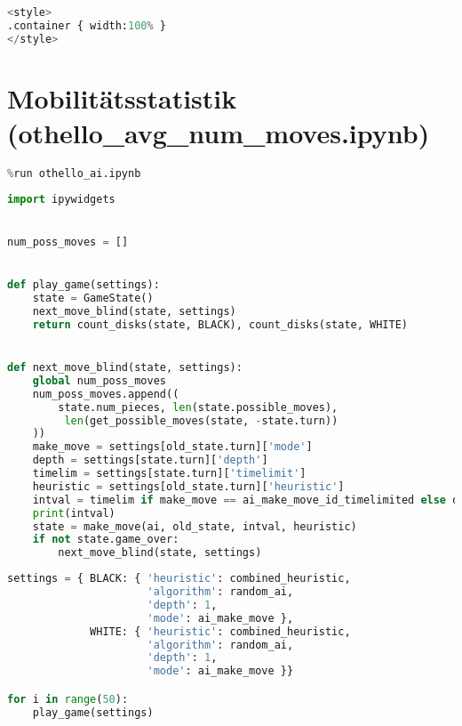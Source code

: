 \begin{lstlisting}[language=Python]
%%HTML
<style>
.container { width:100% }
</style>
\end{lstlisting}

\hypertarget{mobilituxe4tsstatistik-othello_avg_num_moves.ipynb}{%
\section{Mobilitätsstatistik
(othello\_avg\_num\_moves.ipynb)}\label{mobilituxe4tsstatistik-othello_avg_num_moves.ipynb}}

\begin{lstlisting}[language=Python]
%run othello_game.ipynb
%run othello_ai.ipynb
\end{lstlisting}

\begin{lstlisting}[language=Python]
import ipywidgets


num_poss_moves = []


def play_game(settings):
    state = GameState()
    next_move_blind(state, settings)
    return count_disks(state, BLACK), count_disks(state, WHITE)


def next_move_blind(state, settings):
    global num_poss_moves
    num_poss_moves.append((
        state.num_pieces, len(state.possible_moves),
         len(get_possible_moves(state, -state.turn))
    ))
    make_move = settings[old_state.turn]['mode']
    depth = settings[state.turn]['depth']
    timelim = settings[state.turn]['timelimit']
    heuristic = settings[old_state.turn]['heuristic']
    intval = timelim if make_move == ai_make_move_id_timelimited else depth
    print(intval)
    state = make_move(ai, old_state, intval, heuristic)
    if not state.game_over:
        next_move_blind(state, settings)
\end{lstlisting}

\begin{lstlisting}[language=Python]
settings = { BLACK: { 'heuristic': combined_heuristic,
                      'algorithm': random_ai,
                      'depth': 1,
                      'mode': ai_make_move },
             WHITE: { 'heuristic': combined_heuristic,
                      'algorithm': random_ai,
                      'depth': 1,
                      'mode': ai_make_move }}

for i in range(50):
    play_game(settings)
\end{lstlisting}

